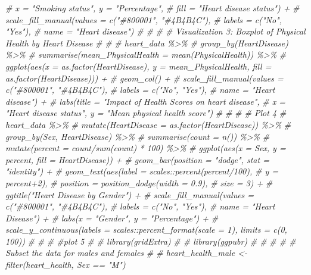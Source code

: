 \documentclass[
]{article}
\newenvironment{Shaded}{\begin{snugshade}}{\end{snugshade}}
\newcommand{\CommentTok}[1]{\textcolor[rgb]{0.56,0.35,0.01}{\textit{#1}}}
\begin{document}
\begin{Shaded}
\begin{Highlighting}[]
\CommentTok{\#        x = "Smoking status", y = "Percentage",}
\CommentTok{\#        fill = "Heart disease status") +}
\CommentTok{\#   scale\_fill\_manual(values = c("\#800001", "\#4B4B4C"),}
\CommentTok{\#                     labels = c("No", "Yes"),}
\CommentTok{\#                     name = "Heart disease")}
\CommentTok{\# }
\CommentTok{\# }
\CommentTok{\# \# Visualization 3: Boxplot of Physical Health by Heart Disease}
\CommentTok{\# }
\CommentTok{\# }
\CommentTok{\# heart\_data \%\textgreater{}\%}
\CommentTok{\#   group\_by(HeartDisease) \%\textgreater{}\%}
\CommentTok{\#   summarise(mean\_PhysicalHealth = mean(PhysicalHealth)) \%\textgreater{}\%}
\CommentTok{\#   ggplot(aes(x = as.factor(HeartDisease), y = mean\_PhysicalHealth, fill = as.factor(HeartDisease))) +}
\CommentTok{\#   geom\_col() +}
\CommentTok{\#   scale\_fill\_manual(values = c("\#800001", "\#4B4B4C"),}
\CommentTok{\#                     labels = c("No", "Yes"),}
\CommentTok{\#                     name = "Heart disease") +}
\CommentTok{\#   labs(title = "Impact of Health Scores on heart disease", }
\CommentTok{\#        x = "Heart disease status", y = "Mean physical health score") }
\CommentTok{\# }
\CommentTok{\# }
\CommentTok{\# \# Plot 4}
\CommentTok{\# heart\_data \%\textgreater{}\%}
\CommentTok{\#   mutate(HeartDisease = as.factor(HeartDisease)) \%\textgreater{}\%}
\CommentTok{\#   group\_by(Sex, HeartDisease) \%\textgreater{}\%}
\CommentTok{\#   summarise(count = n()) \%\textgreater{}\%}
\CommentTok{\#   mutate(percent = count/sum(count) * 100) \%\textgreater{}\%}
\CommentTok{\#   ggplot(aes(x = Sex, y = percent, fill = HeartDisease)) +}
\CommentTok{\#   geom\_bar(position = "dodge", stat = "identity") +}
\CommentTok{\#   geom\_text(aes(label = scales::percent(percent/100), }
\CommentTok{\#                 y = percent+2),}
\CommentTok{\#             position = position\_dodge(width = 0.9),}
\CommentTok{\#             size = 3) +}
\CommentTok{\#   ggtitle("Heart Disease by Gender") +}
\CommentTok{\#   scale\_fill\_manual(values = c("\#800001", "\#4B4B4C"), }
\CommentTok{\#                     labels = c("No", "Yes"),}
\CommentTok{\#                     name = "Heart Disease") +}
\CommentTok{\#   labs(x = "Gender", y = "Percentage") +}
\CommentTok{\#   scale\_y\_continuous(labels = scales::percent\_format(scale = 1), limits = c(0, 100))}
\CommentTok{\# }
\CommentTok{\# }
\CommentTok{\# \#plot 5}
\CommentTok{\# \# library(gridExtra)}
\CommentTok{\# \# library(ggpubr)}
\CommentTok{\# \# }
\CommentTok{\# \# \# Subset the data for males and females}
\CommentTok{\# \# heart\_health\_male \textless{}{-} filter(heart\_health, Sex == "M")}

\end{Highlighting}
\end{Shaded}
\end{document}
